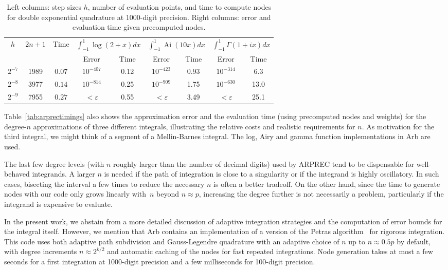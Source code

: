 \documentclass[11pt,a4paper]{article}
\begin{document}
\begin{table}[h!]
\begin{centering}
\begin{tabular}{ c c c | c c | c c | c c }
$h$ & $2n+1$ & Time &
    \multicolumn{2}{|c|}{$\int_{-1}^{1}\!\log(2\!+\!x) dx$} &
    \multicolumn{2}{|c|}{$\int_{-1}^{1}\!\operatorname{Ai}(10 x) dx$} &
    \multicolumn{2}{|c}{$\int_{-1}^{1}\!\Gamma(1\!+\!ix) dx$} \\ 
   &         &          & Error   & Time      &  Error & Time  &  Error & Time \\ \hline
$2^{-7}$ & 1989 & $0.07$ & $10^{-407}$ & 0.12 & $10^{-423}$ & 0.93 & $10^{-314}$ & 6.3 \\
$2^{-8}$ & 3977 & $0.14$ & $10^{-814}$ & 0.25 & $10^{-909}$ & 1.75 & $10^{-630}$ & 13.0 \\
$2^{-9}$ & 7955 & $0.27$ & $<\varepsilon$ & 0.55 & $<\varepsilon$ & 3.49 & $<\varepsilon$ & 25.1
\end{tabular}
\caption{Left columns: step sizes $h$, number of evaluation
points, and time to compute nodes for double exponential quadrature
at 1000-digit precision. Right columns: error and evaluation
time given precomputed nodes.}
\label{tab:dequad}
\end{centering}
\end{table}

Table~\ref{tab:arprectimings} also
shows the approximation error
and the evaluation time (using precomputed nodes and weights)
for the degree-$n$ approximations of three different integrals,
illustrating the relative costs and realistic requirements for $n$.
As motivation for the third integral, we might think
of a segment of a Mellin-Barnes integral.
The log, Airy and gamma function implementations in Arb are used.

The last few degree levels (with $n$ roughly larger than
the number of decimal digits) used by ARPREC
tend to be dispensable for well-behaved integrands.
A larger $n$ is needed if the path of integration
is close to a singularity or if the integrand is highly oscillatory.
In such cases, bisecting the interval a few times
to reduce the necessary $n$ is often a better tradeoff.
On the other hand, since the time to generate nodes with our code only
grows linearly with~$n$ beyond $n \approx p$,
increasing the degree further is not necessarily a problem,
particularly if the integrand is expensive to evaluate.

In the present work, we abstain from a more detailed discussion of
adaptive integration strategies and the computation
of error bounds for the integral itself.
However, we mention that Arb contains an implementation of a
version of the Petras algorithm~\cite{petras2002self} for rigorous
integration. This code uses both adaptive path subdivision
and Gauss-Legendre quadrature with an adaptive choice of $n$ up to
$n \approx 0.5p$ by default, with degree increments
$n \approx 2^{k/2}$ and automatic caching of the nodes
for fast repeated integrations.
Node generation takes at most a few seconds for a first integration
at 1000-digit precision
and a few milliseconds for 100-digit precision.
\end{document}
